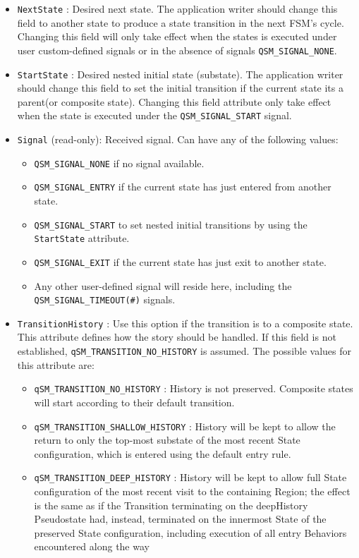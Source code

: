 \begin{itemize}
    \item \lstinline{NextState} : Desired next state. The application writer should change this field to another state to produce a state transition in the next FSM's cycle. Changing this field will only take effect when the states is executed under user custom-defined signals or in the absence of signals \lstinline{QSM_SIGNAL_NONE}.
    \item \lstinline{StartState} :  Desired nested initial state (substate). The application writer should change this field to set the initial transition if the current state its a parent(or composite state). Changing this field attribute only take effect when the state is executed under the \lstinline{QSM_SIGNAL_START} signal.
    \item \lstinline{Signal} (read-only): Received signal. Can have any of the following values: 
    \begin{itemize}
        \item \lstinline{QSM_SIGNAL_NONE} if no signal available.
        \item \lstinline{QSM_SIGNAL_ENTRY} if the current state has just entered from another state.
        \item \lstinline{QSM_SIGNAL_START} to set nested initial transitions by using the \lstinline{StartState} attribute.
        \item \lstinline{QSM_SIGNAL_EXIT} if the current state has just exit to another state.
        \item Any other user-defined signal will reside here, including the \lstinline{QSM_SIGNAL_TIMEOUT(#)} signals.
    \end{itemize}    
    \item \lstinline{TransitionHistory} : Use this option if the transition is to a composite state. This attribute defines how the story should be handled. If this field is not established, \lstinline{qSM_TRANSITION_NO_HISTORY} is assumed. The possible values for this attribute are:
    \begin{itemize}
        \item \lstinline{qSM_TRANSITION_NO_HISTORY} : History is not preserved. Composite states will start according to their default transition.
        \item \lstinline{qSM_TRANSITION_SHALLOW_HISTORY} : History will be kept to allow the return to only the top-most substate of the most recent State configuration, which is entered using the default entry rule.
        \item \lstinline{qSM_TRANSITION_DEEP_HISTORY} : History will be kept to allow full State configuration of the most recent visit to the containing Region; the effect is the same as if the Transition terminating on the deepHistory Pseudostate had, instead, terminated on the innermost State of the preserved State configuration, including execution of all entry Behaviors encountered along the way

\end{itemize}
\end{itemize}
